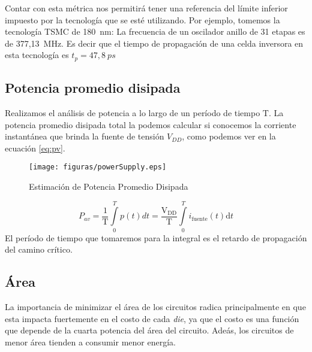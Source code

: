 Contar con esta métrica nos permitirá tener una referencia del límite inferior impuesto por la tecnología que se esté utilizando. Por ejemplo, tomemos la tecnología TSMC de 180~nm: La frecuencia de un oscilador anillo de 31 etapas es de 377,13~MHz. Es decir que el tiempo de propagación de una celda inversora en esta tecnología es $t_p = 47,8~ps$












\subsection{Potencia promedio disipada}
Realizamos el análisis de potencia a lo largo de un período de tiempo $\mathrm{T}$. La potencia promedio disipada total la podemos calcular si conocemos la corriente instantánea que brinda la fuente de tensión $V_{DD}$, como podemos ver en la ecuación \ref{eq:pv}.
\begin{figure}[h]
\centering
\texttt{[image: figuras/powerSupply.eps]}
  \caption{Estimación de Potencia Promedio Disipada }
  \label{fig:powerSupply}
\end{figure}

\begin{equation}
P_{av} = \frac{1}{\mathrm{T}}\int\limits_0^T p(t)dt = \mathrm{\frac{V_{DD}}{T}}\int\limits_0^T i_{\mathrm{fuente}}(t)\mathrm{d}t 
\label{eq:pv}
\end{equation}
El período de tiempo que tomaremos para la integral es el retardo de propagación del camino crítico.

\subsection{Área}
La importancia de minimizar el área de los circuitos radica principalmente en que esta impacta fuertemente en el costo de cada \emph{die}, ya que el costo es una función que depende de la cuarta potencia del área del circuito\cite{rabaey2003}. Adeás, los circuitos de menor área tienden a consumir menor energía. 


